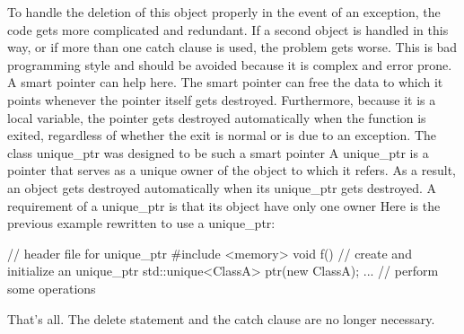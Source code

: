 \documentclass{report}
\begin{document}
\bigbreak \noindent 
To handle the deletion of this object properly in the event of an exception, the code gets more complicated and redundant. If a second object is handled in this way, or if more than one catch clause is used, the problem gets worse. This is bad programming style and should be avoided because it is complex and error prone.
\bigbreak \noindent 
A smart pointer can help here. The smart pointer can free the data to which it points whenever the pointer itself gets destroyed. Furthermore, because it is a local variable, the pointer gets destroyed automatically when the function is exited, regardless of whether the exit is normal or is due to an exception. The class unique\_ptr was designed to be such a smart pointer
\bigbreak \noindent 
A unique\_ptr is a pointer that serves as a unique owner of the object to which it refers. As a result, an object gets destroyed automatically when its unique\_ptr gets destroyed. A requirement of a unique\_ptr is that its object have only one owner
\bigbreak \noindent 
Here is the previous example rewritten to use a unique\_ptr:
\bigbreak \noindent 
\begin{cppcode}
    // header file for unique_ptr
    #include <memory>
    void f()
    {
        // create and initialize an unique_ptr
        std::unique<ClassA> ptr(new ClassA);
        ... // perform some operations
    }
\end{cppcode}
\bigbreak \noindent 
That’s all. The delete statement and the catch clause are no longer necessary.
\bigbreak \noindent 
\end{document}
